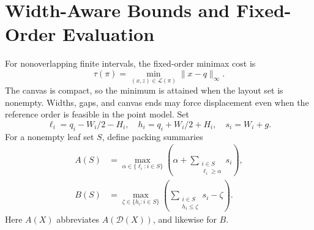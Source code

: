\documentclass[10pt]{article}
\begin{document}
\section{Width-Aware Bounds and Fixed-Order Evaluation}\label{sec:width}
For nonoverlapping finite intervals, the fixed-order minimax cost is
\begin{equation}\label{eq:tau}
 \tau(\pi)=\min_{(x,z)\in\mathcal{L}(\pi)}\|x-q\|_\infty.
\end{equation}
The canvas is compact, so the minimum is attained when the layout set is nonempty. Widths, gaps, and canvas ends may force displacement even when the reference order is feasible in the point model. Set
\begin{equation}
 \ell_i=q_i-W_i/2-H_i,\quad h_i=q_i+W_i/2+H_i,
 \quad s_i=W_i+g.
\end{equation}
For a nonempty leaf set $S$, define packing summaries
\begin{equation}\label{eq:AB}
\begin{aligned}
 A(S)&=\max_{\alpha\in\{\ell_i:i\in S\}}
 \left(\alpha+\sum_{\substack{i\in S\\\ell_i\ge\alpha}}s_i\right),\\
 B(S)&=\max_{\zeta\in\{h_i:i\in S\}}
 \left(\sum_{\substack{i\in S\\h_i\le\zeta}}s_i-\zeta\right).
\end{aligned}
\end{equation}
Here $A(X)$ abbreviates $A(\mathcal{D}(X))$, and likewise for $B$.
\end{document}
